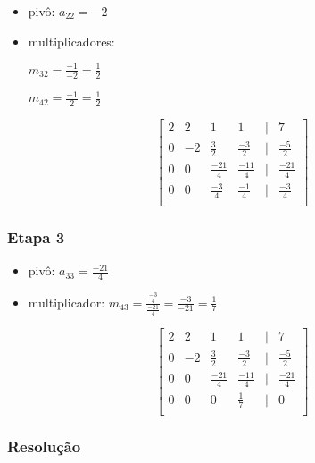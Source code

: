 \documentclass[a4paper]{article}
\begin{document}
\begin{itemize}
\item pivô: $a_{22} = -2$

\item multiplicadores:

$m_{32}=\frac{-1}{-2} = \frac{1}{2}$

$m_{42} = \frac{-1}{2} = \frac{1}{2}$

\end{itemize}
\begin{displaymath}
  \begin{bmatrix}
    2 & 2 & 1 & 1 & | & 7\\
    0 & -2 & \frac{3}{2} & \frac{-3}{2} & | & \frac{-5}{2}\\
    0 & 0 & \frac{-21}{4} & \frac{-11}{4} & | & \frac{-21}{4}\\
    0 & 0 & \frac{-3}{4} & \frac{-1}{4} & | & \frac{-3}{4}\\
  \end{bmatrix}
\end{displaymath}

\subsubsection{Etapa 3}

\begin{itemize}
\item pivô: $a_{33} = \frac{-21}{4}$

\item multiplicador: $m_{43}=\frac{\frac{-3}{4}}{\frac{-21}{4}} =
\frac{-3}{-21} = \frac{1}{7}$

\end{itemize}
\begin{displaymath}
  \begin{bmatrix}
    2 & 2 & 1 & 1 & | & 7\\
    0 & -2 & \frac{3}{2} & \frac{-3}{2} & | & \frac{-5}{2}\\
    0 & 0 & \frac{-21}{4} & \frac{-11}{4} & | & \frac{-21}{4}\\
    0 & 0 & 0 & \frac{1}{7} & | & 0\\
  \end{bmatrix}
\end{displaymath}

\subsubsection{Resolução}
\end{document}
